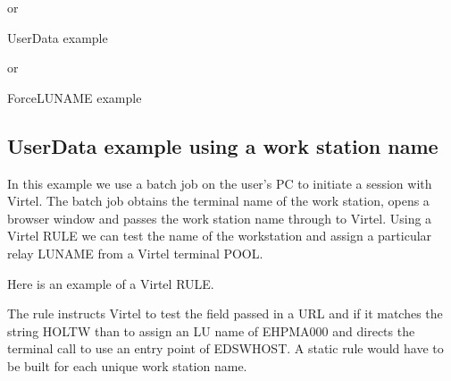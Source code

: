 \documentclass[letterpaper,10pt,english]{sphinxmanual}
\begin{document}
\sphinxAtStartPar
or

\sphinxAtStartPar
{}            UserData example

\sphinxAtStartPar
or

\sphinxAtStartPar
{}          ForceLUNAME example

\ignorespaces 

\subsection{UserData example using a work station name}
\label{\detokenize{connectivity_guide:userdata-example-using-a-work-station-name}}\label{\detokenize{connectivity_guide:index-153}}
\sphinxAtStartPar
In this example we use a batch job on the user’s PC to initiate a session with Virtel. The batch job obtains the terminal name of the work station, opens a browser window and passes the work station name through to Virtel. Using a Virtel RULE we can test the name of the workstation and assign a particular relay LUNAME from a Virtel terminal POOL.

\sphinxAtStartPar
Here is an example of a Virtel RULE.

\begin{sphinxVerbatim}[commandchars=\\\{\}]
 
\end{sphinxVerbatim}

\sphinxAtStartPar
The rule instructs Virtel to test the  field passed in a URL and if it matches the string HOLT\sphinxhyphen{}W than to assign an LU name of EHPMA000 and directs the terminal call to use an entry point of EDSWHOST. A static rule would have to be built for each unique work station name.
\end{document}
